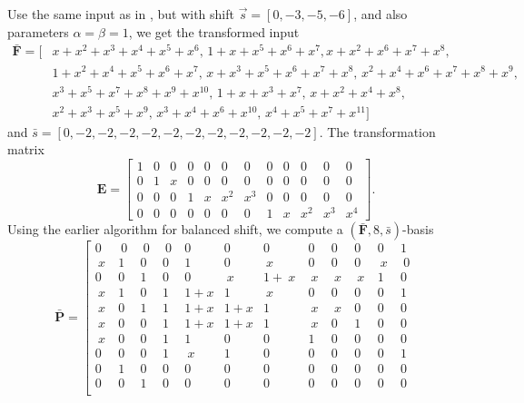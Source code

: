 \begin{exmp}
\label{exm:unbalancedShift} Use the same input as in ,
but with shift $\vec{s}=[0,-3,-5,-6]$, and also parameters $\alpha=\beta=1$,
we get the transformed input \begin{align*}
\bar{\mathbf{F}}=[ & x+x^{2}+x^{3}+x^{4}+x^{5}+x^{6},\,1+x+x^{5}+x^{6}+x^{7},x+x^{2}+x^{6}+x^{7}+x^{8},\\
 & 1+x^{2}+x^{4}+x^{5}+x^{6}+x^{7},\, x+x^{3}+x^{5}+x^{6}+x^{7}+x^{8},\, x^{2}+x^{4}+x^{6}+x^{7}+x^{8}+x^{9},\\
 & x^{3}+x^{5}+x^{7}+x^{8}+x^{9}+x^{10},\,1+x+x^{3}+x^{7},\, x+x^{2}+x^{4}+x^{8},\\
 & x^{2}+x^{3}+x^{5}+x^{9},\, x^{3}+x^{4}+x^{6}+x^{10},\, x^{4}+x^{5}+x^{7}+x^{11}]\end{align*}
 and $\bar{s}=[0,-2,-2,-2,-2,-2,-2,-2,-2,-2,-2,-2]$. The transformation
matrix \[
\mathbf{E}=\left[{\begin{array}{r|rc|rccc|rcccc}
1 & 0 & 0 & 0 & 0 & 0 & 0 & 0 & 0 & 0 & 0 & 0\\
\hline 0 & 1 & x & 0 & 0 & 0 & 0 & 0 & 0 & 0 & 0 & 0\\
\hline 0 & 0 & 0 & 1 & x & x^{2} & x^{3} & 0 & 0 & 0 & 0 & 0\\
\hline 0 & 0 & 0 & 0 & 0 & 0 & 0 & 1 & x & x^{2} & x^{3} & x^{4}\end{array}}\right].\]
 Using the earlier algorithm for balanced shift, we compute a $(\bar{\mathbf{F}},8,\bar{s})$-basis
\[
\bar{\mathbf{P}}=\left[{\begin{array}{cccccccccccc}
0 & ~0~ & ~0~ & ~0~ & 0 & 0 & 0 & 0 & 0 & 0 & 0 & 1\\
\hline ~x~ & 1 & 0 & 0 & 1 & 0 & ~x~ & 0 & 0 & 0 & ~x~ & ~0~\\
0 & 0 & 1 & 0 & 0 & ~x~ & 1+~x~ & ~x~ & ~x~ & ~x~ & 1 & 0\\
\hline ~x~ & 1 & 0 & 1 & 1+x & 1 & ~x~ & 0 & 0 & 0 & 0 & 1\\
~x~ & 0 & 1 & 1 & 1+x & 1+x & 1 & ~x~ & ~x~ & 0 & 0 & 0\\
~x~ & 0 & 0 & 1 & 1+x & 1+x & 1 & ~x~ & 0 & 1 & 0 & 0\\
~x~ & 0 & 0 & 1 & 1 & 0 & 0 & 1 & 0 & 0 & 0 & 0\\
\hline 0 & 0 & 0 & 1 & ~x~ & 1 & 0 & 0 & 0 & 0 & 0 & 1\\
0 & 1 & 0 & 0 & 0 & 0 & 0 & 0 & 0 & 0 & 0 & 0\\
0 & 0 & 1 & 0 & 0 & 0 & 0 & 0 & 0 & 0 & 0 & 0\\

\end{array}}\]
\end{exmp}
